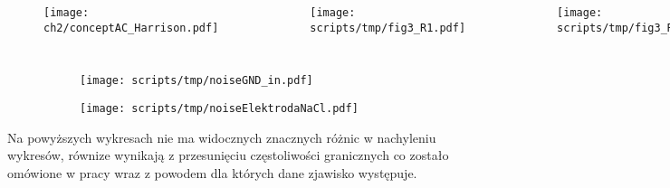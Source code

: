 \begin{frame}[t]

    \begin{block}{\tb}
    \end{block}
    \begin{columns}
        \begin{figure}[H]
            \centering
            \texttt{[image: ch2/conceptAC\_Harrison.pdf]} 
        \end{figure}
            \begin{figure}[H]
                \centering
                \texttt{[image: scripts/tmp/fig3\_R1.pdf]}
            \end{figure}
            \begin{figure}[H]
                \centering
                \texttt{[image: scripts/tmp/fig3\_R2.pdf]}
            \end{figure}
        \end{columns}
        
        \begin{figure}[H]
            \centering
            \begin{subfigure}[b]{0.485\textwidth}
                \centering
                \texttt{[image: scripts/tmp/noiseGND\_in.pdf]}
            \end{subfigure}
            \begin{subfigure}[b]{0.485\textwidth}
                \centering
                \texttt{[image: scripts/tmp/noiseElektrodaNaCl.pdf]}
            \end{subfigure}     
        \end{figure}
        Na powyższych wykresach nie ma widocznych znacznych różnic w nachyleniu wykresów, równize wynikają z przesunięciu częstoliwości granicznych co zostało omówione w pracy wraz z powodem dla których dane zjawisko występuje. 
\end{frame}



\begin{frame}[t]
    \begin{block}{\tb}
    \end{block}
    
\end{frame}

